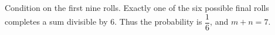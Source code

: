 Condition on the first nine rolls. Exactly one of the six possible final rolls completes a sum divisible by $6$. Thus the probability is $\dfrac{1}{6}$, and $m+n=\boxed7$.
